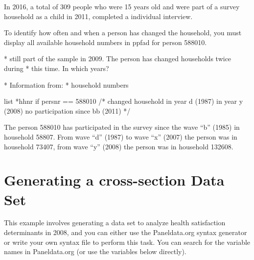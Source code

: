 \documentclass[letterpaper,10pt,openany,onesideH,english]{sphinxmanual}
\begin{document}
\begin{figure}[H]
\centering

\noindent{}
\end{figure}

In 2016, a total of 309 people who were 15 years old and were part of a survey household as a child in 2011, completed a individual interview.


To identify how often and when a person has changed the household, you must display all available household numbers in ppfad for person 588010.

%
\begin{sphinxVerbatim}[commandchars=\\\{\},numbers=left,firstnumber=1,stepnumber=1]
* still part of the sample in 2009. The person has changed households twice during
* this time. In which years?

* Information from:
* \PYGZhy{}\PYGZgt{} household numbers

list *hhnr if persnr == 588010
/* \PYGZhy{}\PYGZgt{} changed household 
 in year d (1987)
 in year y (2008)
 no participation since bb (2011) 
*/
\end{sphinxVerbatim}

\begin{figure}[H]
\centering

\noindent{}
\end{figure}

The person 588010 has participated in the survey since the wave “b” (1985) in household 58807. From wave “d” (1987) to wave “x” (2007) the person was in household 73407, from wave “y” (2008) the person was in household 132608.


\section{Generating a cross-section Data Set}
\label{\detokenize{Working with SOEP Data/index:generating-a-cross-section-data-set}}\label{\detokenize{Working with SOEP Data/index:cross-data}}
This example involves generating a data set to analyze health satisfaction determinants in 2008, and you can either use the Paneldata.org syntax generator or write your own syntax file to perform this task. You can search for the variable names in Paneldata.org (or use the variables below directly).
\end{document}
